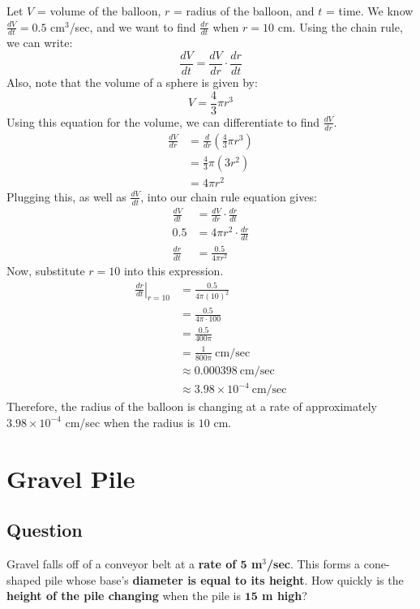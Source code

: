 \documentclass[12pt]{article}
\newcommand\at[2]{\left.#1\right|_{#2}}
\begin{document}
Let $ V $ = volume of the balloon, $ r $ = radius of the balloon, and $ t $ = time.
\medskip
\newline
We know $ \frac{dV}{dt} = 0.5 $ cm$ ^3 $/sec, and we want to find $ \frac{dr}{dt} $ when $ r = 10 $ cm. Using the chain rule, we can write:
\[ \frac{dV}{dt} = \frac{dV}{dr} \cdot \frac{dr}{dt} \]
Also, note that the volume of a sphere is given by:
\[ V = \frac{4}{3} \pi r^3 \]
Using this equation for the volume, we can differentiate to find $ \frac{dV}{dr} $.
\begin{align*}
    \frac{dV}{dr} & = \frac{d}{dr} \left( \frac{4}{3} \pi r^3 \right) \\
    & = \frac{4}{3} \pi \left( 3 r^2 \right) \\
    & = 4 \pi r^2
\end{align*}
Plugging this, as well as $ \frac{dV}{dt} $, into our chain rule equation gives:
\begin{align*}
    \frac{dV}{dt} & = \frac{dV}{dr} \cdot \frac{dr}{dt} \\
    0.5 & = 4 \pi r^2 \cdot \frac{dr}{dt} \\
    \frac{dr}{dt} & = \frac{0.5}{4 \pi r^2}
\end{align*}
Now, substitute $ r = 10 $ into this expression.
\begin{align*}
    \at{\frac{dr}{dt}}{r = 10} & = \frac{0.5}{4 \pi \left( 10 \right)^2} \\
    & = \frac{0.5}{4 \pi \cdot 100} \\
    & = \frac{0.5}{400 \pi} \\
    & = \frac{1}{800 \pi} \ \text{cm/sec} \\
    & \approx 0.000398 \ \text{cm/sec} \\
    & \approx 3.98 \times 10^{-4} \ \text{cm/sec}
\end{align*}
Therefore, the radius of the balloon is changing at a rate of approximately $ 3.98 \times 10^{-4} $ cm/sec when the radius is $ 10 $ cm.

\section*{Gravel Pile}

\subsection*{Question}

Gravel falls off of a conveyor belt at a \textbf{rate of $ \mathbf{5} $ m$ ^3 $/sec}. This forms a cone-shaped pile whose base's \textbf{diameter is equal to its height}. How quickly is the \textbf{height of the pile changing} when the pile is \textbf{$ \mathbf{15} $ m high}?
\end{document}
